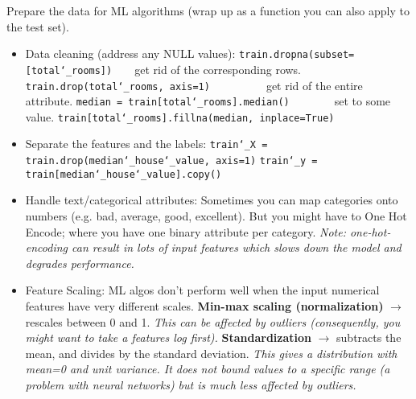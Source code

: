 Prepare the data for ML algorithms (wrap up as a function you can also apply to the test set).
\vspace{-3.0mm}
\begin{itemize}
\item
Data cleaning (address any NULL values):\newline
\texttt{train.dropna(subset=[\textquotesingle total\char`_rooms\textquotesingle])}~~~~get rid of the corresponding rows.\newline
\texttt{train.drop(\textquotesingle total\char`_rooms\textquotesingle, axis=1)}~~~~~~~~~~get rid of the entire attribute.\newline
\texttt{median = train[\textquotesingle total\char`_rooms\textquotesingle].median()}~~~~~~~~set to some value.\newline
\texttt{train[\textquotesingle total\char`_rooms\textquotesingle].fillna(median, inplace=True)}
\item
Separate the features and the labels:\newline
\texttt{train\char`_X = train.drop(\textquotesingle median\char`_house\char`_value\textquotesingle, axis=1)}\newline
\texttt{train\char`_y = train[\textquotesingle median\char`_house\char`_value\textquotesingle].copy()}
\item
Handle text/categorical attributes:\newline
Sometimes you can map categories onto numbers (e.g. bad, average, good, excellent).\newline
But you might have to One Hot Encode;
where you have one binary attribute per category.\newline
\textit{Note: one-hot-encoding can result in lots of input features
which slows down the model and degrades performance.}
\item
Feature Scaling:\newline
ML algos don't perform well when the input numerical features have very different scales.
\textbf{Min-max scaling (normalization)} $\rightarrow$ rescales between 0 and 1.\newline
\textit{This can be affected by outliers (consequently, you might want to take a features log first).}\newline
\textbf{Standardization} $\rightarrow$ subtracts the mean, and divides by the standard deviation.\newline
\textit{This gives a distribution with mean=0 and unit variance.
It does not bound values to a specific range (a problem with neural networks)
but is much less affected by outliers.}\newline


\end{itemize}
